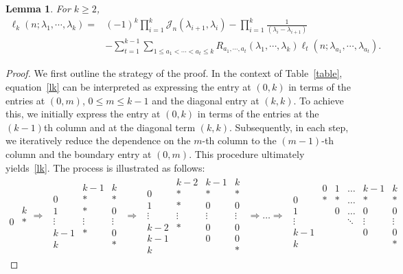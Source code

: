 \documentclass[10pt,a4paper]{amsart}
\newtheorem{lem}{Lemma}
\newcommand{\nn}{\nonumber}
\begin{document}
\begin{lem}
	For $k\ge2$,
	\begin{align}
		\ell_k(n;\lambda_1,\cdots,\lambda_k)=&(-1)^k\prod_{i=1}^k\mathcal J_n(\lambda_{i+1},\lambda_i)-\prod_{i=1}^k\frac{1}{(\lambda_i-\lambda_{i+1})}\nn\\
		&-\sum_{t=1}^{k-1}\sum_{1\le a_1<\cdots<a_t\le k}R_{a_1,\cdots,a_t}(\lambda_1,\cdots,\lambda_k)\ell_t(n;\lambda_{a_1},\cdots,\lambda_{a_t}). \label{lk}
	\end{align}
\end{lem}

\begin{proof}
	We first outline the strategy of the proof. In the context of Table~\eqref{table}, equation~\eqref{lk} can be interpreted as expressing the entry at $(0,k)$ in terms of the entries at $(0,m)$, $0\le m\le k-1$ and the diagonal entry at $(k,k)$. To achieve this, we initially express the entry at $(0,k)$ in terms of the entries at the $(k-1)$th column and at the diagonal term $(k,k)$. Subsequently, in each step, we iteratively reduce the dependence on the $m$-th column to the $(m-1)$-th column and the boundary entry at $(0,m)$. This procedure ultimately yields~\eqref{lk}. The process is illustrated as follows:
	\[
	\begin{array}{c|c}
		 & k \\ \hline
		 0 & *
	\end{array}
	\Rightarrow
	\begin{array}{c}
		\begin{array}{c|cc}
			 & k-1 & k \\ \hline
			0 & * & * \\
			1 & * & 0 \\
			\vdots & \vdots & \vdots \\
			k-1 & * & 0 \\
			k & & * 
		\end{array}
	\end{array}
	\Rightarrow
	\begin{array}{c}
		\begin{array}{c|ccc}
			& k-2 & k-1 & k \\ \hline
			0 & * & * & * \\
			1 & * & 0 & 0 \\
			\vdots & \vdots & \vdots & \vdots \\
			k-2 & * & 0 & 0 \\
			k-1 & & 0 & 0 \\
			k & &  & * 
		\end{array}
	\end{array}
	\Rightarrow \dots \Rightarrow
	\begin{array}{c}
		\begin{array}{c|ccccc}
			& 0 & 1 & \dots & k-1 & k \\ \hline
			0 & * & * & \dots & * & * \\
			1 & & 0 & \dots & 0 & 0 \\
			\vdots & &  & \ddots & \vdots & \vdots \\
			k-1 & &  &  & 0 & 0 \\ 
			k & & &  & & * 
		\end{array}
	\end{array}
	\]
	

\end{proof}
\end{document}

